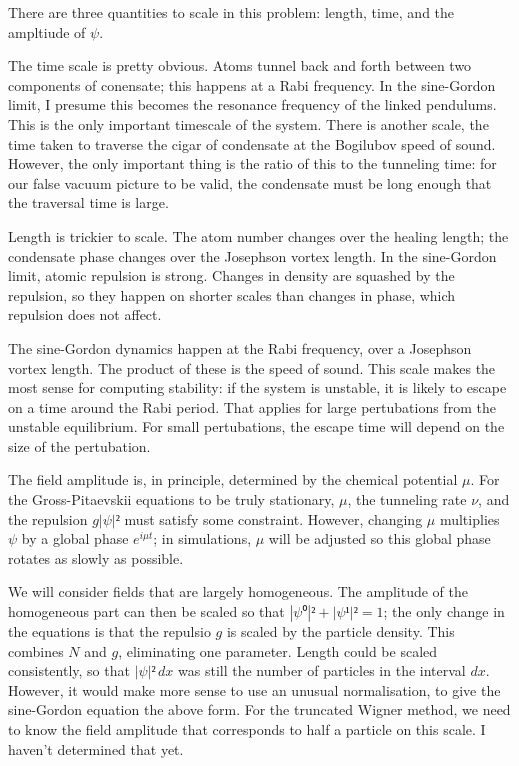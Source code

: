 There are three quantities to scale in this problem: length, time, and the ampltiude of $ψ$.

The time scale is pretty obvious.  Atoms tunnel back and forth between two components of conensate; this happens at a Rabi frequency.  In the sine-Gordon limit, I presume this becomes the resonance frequency of the linked pendulums.  This is the only important timescale of the system.  There is another scale, the time taken to traverse the cigar of condensate at the Bogilubov speed of sound.  However, the only important thing is the ratio of this to the tunneling time: for our false vacuum picture to be valid, the condensate must be long enough that the traversal time is large.

Length is trickier to scale.  The atom number changes over the healing length; the condensate phase changes over the Josephson vortex length.  In the sine-Gordon limit, atomic repulsion is strong.  Changes in density are squashed by the repulsion, so they happen on shorter scales than changes in phase, which repulsion does not affect.

The sine-Gordon dynamics happen at the Rabi frequency, over a Josephson vortex length.  The product of these is the speed of sound.  This scale makes the most sense for computing stability: if the system is unstable, it is likely to escape on a time around the Rabi period.  That applies for large pertubations from the unstable equilibrium.  For small pertubations, the escape time will depend on the size of the pertubation.

The field amplitude is, in principle, determined by the chemical potential $μ$.  For the Gross-Pitaevskii equations to be truly stationary, $μ$, the tunneling rate $ν$, and the repulsion $g|ψ|²$ must satisfy some constraint.  However, changing $μ$ multiplies $ψ$ by a global phase $e^{iμt}$; in simulations, $μ$ will be adjusted so this global phase rotates as slowly as possible.

We will consider fields that are largely homogeneous.  The amplitude of the homogeneous part can then be scaled so that $|ψ⁰|²+|ψ¹|²=1$; the only change in the equations is that the repulsio $g$ is scaled by the particle density.  This combines $N$ and $g$, eliminating one parameter.  Length could be scaled consistently, so that $|ψ|²\,dx$ was still the number of particles in the interval $dx$.  However, it would make more sense to use an unusual normalisation, to give the sine-Gordon equation the above form.  For the truncated Wigner method, we need to know the field amplitude that corresponds to half a particle on this scale.  I haven't determined that yet.


